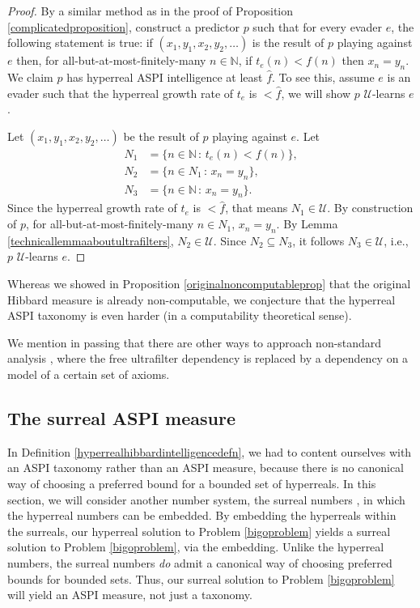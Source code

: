 \documentclass[twoside,11pt]{article}
\begin{document}
\begin{proof}
    By a similar method as in the proof of Proposition \ref{complicatedproposition},
    construct a predictor $p$ such that for every evader $e$, the following statement
    is true: if $(x_1,y_1,x_2,y_2,\ldots)$ is the result of $p$ playing against $e$ then,
    for all-but-at-most-finitely-many $n\in\mathbb N$, if $t_e(n)<f(n)$ then
    $x_n=y_n$. We claim $p$ has hyperreal ASPI intelligence at least $\hat f$.
    To see this, assume $e$ is an evader such that the hyperreal growth rate of $t_e$ is
    $<\hat f$, we will show $p$ $\mathcal U$-learns $e$.

    Let $(x_1,y_1,x_2,y_2,\ldots)$ be the result of $p$ playing against $e$. Let
    \begin{align*}
        N_1 &= \{n\in\mathbb N\,:\,t_e(n)<f(n)\},\\
        N_2 &= \{n\in N_1\,:\,x_n=y_n\},\\
        N_3 &= \{n\in\mathbb N\,:\,x_n=y_n\}.
    \end{align*}
    Since the hyperreal growth rate of $t_e$ is $<\hat f$, that means $N_1\in\mathcal U$.
    By construction of $p$, for all-but-at-most-finitely-many $n\in N_1$,
    $x_n=y_n$. By Lemma \ref{technicallemmaaboutultrafilters}, $N_2\in\mathcal U$.
    Since $N_2\subseteq N_3$, it follows $N_3\in\mathcal U$, i.e.,
    $p$ $\mathcal U$-learns $e$.
\end{proof}

Whereas we showed in Proposition \ref{originalnoncomputableprop} that
the original Hibbard measure is already
non-computable, we conjecture that the hyperreal ASPI taxonomy is even harder
(in a computability theoretical sense).

We mention in passing that there are other ways to approach non-standard analysis
\citep{katz},
where the free ultrafilter dependency is replaced by a dependency on a model of
a certain set of axioms.

\subsection{The surreal ASPI measure}

In Definition \ref{hyperrealhibbardintelligencedefn}, we had to content ourselves
with an ASPI taxonomy rather than an ASPI measure, because there is no canonical
way of choosing a preferred bound for a bounded set of hyperreals.
In this section, we will consider another number system, the surreal numbers
\citep{conway, knuth, ehrlich2012absolute}, in which the hyperreal numbers can be
embedded. By embedding the hyperreals within the surreals, our hyperreal solution
to Problem \ref{bigoproblem} yields a surreal solution to Problem \ref{bigoproblem},
via the embedding.
Unlike the hyperreal numbers, the surreal numbers \emph{do} admit a
canonical way of choosing preferred bounds for bounded sets. Thus, our surreal
solution to Problem \ref{bigoproblem} will yield an ASPI measure, not just a taxonomy.
\end{document}
